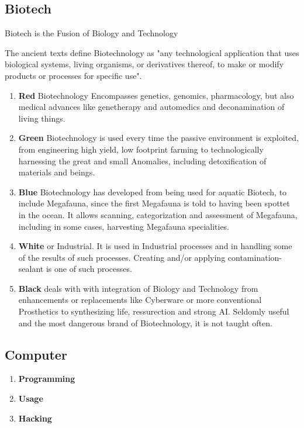 \subsection{Biotech}\label{subsec:biotech}
Biotech is the Fusion of Biology and Technology \par
The ancient texts define Biotechnology as "any technological application that uses biological systems, living organisms,
or derivatives thereof, to make or modify products or processes for specific use".
\begin{enumerate}[label= -]
    \item \textbf{Red} Biotechnology Encompasses genetics, genomics, pharmacology, but also medical advances like
    genetherapy and automedics and deconamination of living things.
    \item \textbf{Green} Biotechnology is used every time the passive environment is exploited, from engineering high yield,
    low footprint farming to technologically harnessing the great and small Anomalies,
    including detoxification of materials and beings.
    \item \textbf{Blue} Biotechnology has developed from being used for aquatic Biotech, to include Megafauna, since the
    first Megafauna is told to having been spottet in the ocean.
    It allows scanning, categorization and assessment of Megafauna, including in some cases, harvesting Megafauna specialities.
    \item \textbf{White} or Industrial.
    It is used in Industrial processes and in handling some of the results of such
    processes.
    Creating and/or applying contamination-sealant is one of such processes.
    \item \textbf{Black} deals with with integration of Biology and Technology from enhancements or replacements like
    Cyberware or more conventional Prosthetics to synthesizing life, ressurection and strong AI. Seldomly useful
    and the most dangerous brand of Biotechnology, it is not taught often.
\end{enumerate}
\subsection{Computer}\label{subsec:computer}
\begin{enumerate}[label= -]
    \item \textbf{Programming} 
    \item \textbf{Usage} 
    \item \textbf{Hacking} 
\end{enumerate}
